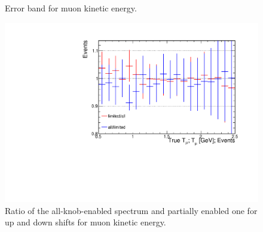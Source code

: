 \documentclass[12pt,a4paper,final]{iopart}
\begin{document}
\begin{figure}[h]
  \centering
  \hfill
  \caption{Error band for muon kinetic energy.}
\end{figure}
\begin{figure}[h]
  \centering
  \includegraphics[angle=-90,origin=c, width=.9\textwidth]{figures/t_muke_ratio.pdf}
  \caption{Ratio of the all-knob-enabled spectrum and partially enabled one for up and down shifts for muon kinetic energy.}
  \label{fig:ratio_muke}
\end{figure}
\end{document}
